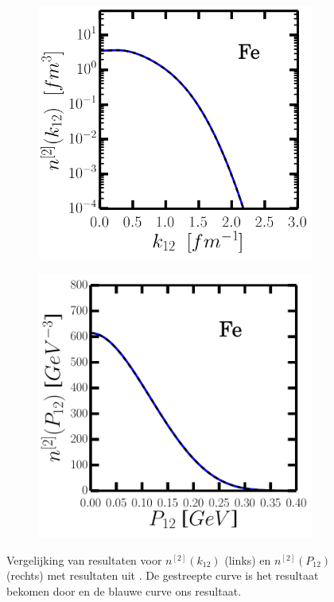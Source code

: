 \documentclass[11pt,twoside]{book}
\begin{document}
\begin{figure}
\begin{subfigure}{0.49\textwidth}
\end{subfigure}
\begin{subfigure}{0.49\textwidth}
\includegraphics[width=\textwidth]{./figuren/Fe_tb_rel.png}
\end{subfigure}
\begin{subfigure}{0.49\textwidth}
\includegraphics[width=\textwidth]{./figuren/Fe_tb_cm.pdf}
\end{subfigure}
\caption{Vergelijking van resultaten voor $n^{[2]}(k_{12})$ (links) en $n^{[2]}(P_{12})$ (rechts) met resultaten uit \cite{maarten}. De gestreepte curve is het resultaat bekomen door \cite{maarten} en de blauwe curve ons resultaat. }
\label{fig:vergelijking}
\end{figure}
\end{document}
